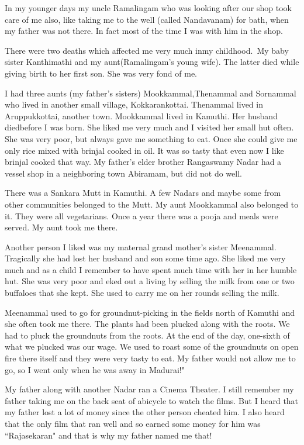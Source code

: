 In my younger days my uncle Ramalingam who was looking after our shop 
took care of me also, like taking me to the well (called Nandavanam) for 
bath, when my father was not there. In fact most of the time I was with 
him in the shop.

There were two deaths which affected me very much in\break my childhood.\ My 
baby sister Kanthimathi and my aunt\break (Ramalingam's young wife). The 
latter died while giving birth to her first son. She was very fond of 
me.

I had three aunts (my father's sisters) Mookkammal,\break Thenammal and 
Sornammal who lived in another small village, Kokkarankottai. Thenammal 
lived in Aruppukkottai, another town. Mookkammal lived in Kamuthi. Her 
husband died\break before I was born. She liked me very much and I visited her 
small hut often. She was very poor, but always gave me something to eat. 
Once she could give me only rice mixed with brinjal cooked in oil. It 
was so tasty that even now I like brinjal cooked that way. My father's 
elder brother Rangaswamy Nadar had a vessel shop in a neighboring town 
Abiramam, but did not do well.

There was a Sankara Mutt in Kamuthi. A few Nadars and maybe some from 
other communities belonged to the Mutt. My aunt Mookkammal also belonged 
to it. They were all vegetarians. Once a year there was a pooja and 
meals were served. My aunt took me there.

Another person I liked was my maternal grand mother's sister Meenammal. 
Tragically she had lost her husband and son some time ago. She liked me 
very much and as a child I remember to have spent much time with her in 
her humble hut. She was very poor and eked out a living by selling the 
milk from one or two buffaloes that she kept. She used to carry me on 
her rounds selling the milk.

Meenammal used to go for groundnut-picking in the fields north of 
Kamuthi and she often took me there. The plants had been plucked along 
with the roots. We had to pluck the groundnuts from the roots. At the 
end of the day, one-sixth of what we plucked was our wage. We used to 
roast some of the groundnuts on open fire there itself and they were 
very tasty to eat. My father would not allow me to go, so I went only 
when he was away in Madurai!"

My father along with another Nadar ran a Cinema Theater. I still 
remember my father taking me on the back seat of a\break bicycle to watch the 
films. But I heard that my father lost a lot of money since the other 
person cheated him. I also heard that the only film that ran well and so 
earned some money for him was ``Rajasekaran" and that is why my father 
named me that!

